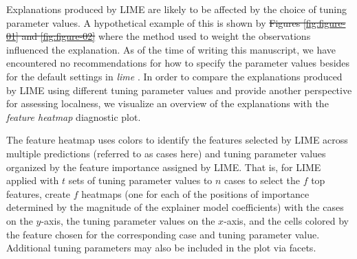 \documentclass[AMS,STIX2COL]{WileyNJD-v2}\usepackage[]{graphicx}\usepackage[]{color}
\providecommand{\DIFadd}[1]{{\protect\color{blue}\uwave{#1}}} %
\providecommand{\DIFdel}[1]{{\protect\color{red}\sout{#1}}}                      %
\providecommand{\DIFaddbegin}{} %
\providecommand{\DIFaddend}{} %
\providecommand{\DIFdelbegin}{} %
\providecommand{\DIFdelend}{} %
\newcommand{\DIFscaledelfig}{0.5}
\newlength{\DIFdelgraphicswidth} %
\newlength{\DIFdelgraphicsheight} %
\newcommand{\DIFaddincludegraphics}[2][]{{\color{blue}\fbox{\DIFOincludegraphics[#1]{#2}}}} %
\newcommand{\DIFdelincludegraphics}[2][]{%
\sbox{\DIFdelgraphicsbox}{\DIFOincludegraphics[#1]{#2}}%
\settoboxwidth{\DIFdelgraphicswidth}{\DIFdelgraphicsbox} %
\settoboxtotalheight{\DIFdelgraphicsheight}{\DIFdelgraphicsbox} %
\scalebox{\DIFscaledelfig}{%
\parbox[b]{\DIFdelgraphicswidth}{\usebox{\DIFdelgraphicsbox}\\[-\baselineskip] \rule{\DIFdelgraphicswidth}{0em}}\llap{\resizebox{\DIFdelgraphicswidth}{\DIFdelgraphicsheight}{%
\setlength{\unitlength}{\DIFdelgraphicswidth}%
\begin{picture}(1,1)%
\thicklines\linethickness{2pt} %
{\color[rgb]{1,0,0}\put(0,0){\framebox(1,1){}}}%
{\color[rgb]{1,0,0}\put(0,0){\line( 1,1){1}}}%
{\color[rgb]{1,0,0}\put(0,1){\line(1,-1){1}}}%
\end{picture}%
}\hspace*{3pt}}} %
} %
\DeclareRobustCommand{\DIFaddbegin}{\DIFOaddbegin \let\includegraphics\DIFaddincludegraphics} %
\DeclareRobustCommand{\DIFaddend}{\DIFOaddend \let\includegraphics\DIFOincludegraphics} %
\DeclareRobustCommand{\DIFdelbegin}{\DIFOdelbegin \let\includegraphics\DIFdelincludegraphics} %
\DeclareRobustCommand{\DIFdelend}{\DIFOaddend \let\includegraphics\DIFOincludegraphics} %
\begin{document}
\DIFdelend Explanations produced by LIME are likely to be affected by the choice of tuning parameter values. A hypothetical example of this is shown by \DIFdelbegin \DIFdel{Figures \ref{fig:figure-01} and \ref{fig:figure-02} }\DIFdelend \DIFaddbegin \DIFadd{Figure \ref{fig:figure-01} }\DIFaddend where the method used to weight the observations influenced the explanation. As of the time of writing this manuscript, we have encountered no recommendations for how to specify the parameter values besides for the default settings in \DIFaddbegin \DIFadd{the }\DIFaddend \emph{lime} \DIFaddbegin \DIFadd{R package}\DIFaddend . In order to compare the explanations produced by LIME using different tuning parameter values and provide another perspective for assessing localness, we visualize an overview of the explanations with the \emph{feature heatmap} diagnostic plot.

The feature heatmap uses colors to identify the features selected by LIME across multiple predictions (referred to as cases here) and tuning parameter values organized by the feature importance assigned by LIME. That is, for LIME applied with $t$ sets of tuning parameter values to $n$ cases to select the $f$ top features, create $f$ heatmaps (one for each of the positions of importance determined by the magnitude of the explainer model coefficients) with the cases on the $y$-axis, the tuning parameter values on the $x$-axis, and the cells colored by the feature chosen for the corresponding case and tuning parameter value. Additional tuning parameters may also be included in the plot via facets.
\end{document}
